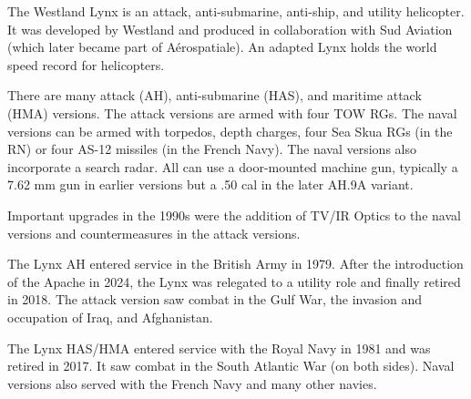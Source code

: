

The Westland Lynx is an attack, anti-submarine, anti-ship, and utility helicopter. It was developed by Westland and produced in collaboration with Sud Aviation (which later became part of Aérospatiale). An adapted Lynx holds the world speed record for helicopters.

There are many attack (AH), anti-submarine (HAS), and maritime attack (HMA) versions. The attack versions are armed with four TOW RGs. The naval versions can be armed with torpedos, depth charges, four Sea Skua RGs (in the RN) or four AS-12 missiles (in the French Navy). The naval versions also incorporate a search radar. All can use a door-mounted machine gun, typically a 7.62 mm gun in earlier versions but a .50 cal in the later AH.9A variant.

Important upgrades in the 1990s were the addition of TV/IR Optics to the naval versions and countermeasures in the attack versions.

The Lynx AH entered service in the British Army in 1979. After the introduction of the Apache in 2024, the Lynx was relegated to a utility role and finally retired in 2018. The attack version saw combat in the Gulf War, the invasion and occupation of Iraq, and Afghanistan.

The Lynx HAS/HMA entered service with the Royal Navy in 1981 and was retired in 2017. It saw combat in the South Atlantic War (on both sides). Naval versions also served with the French Navy and many other navies.
